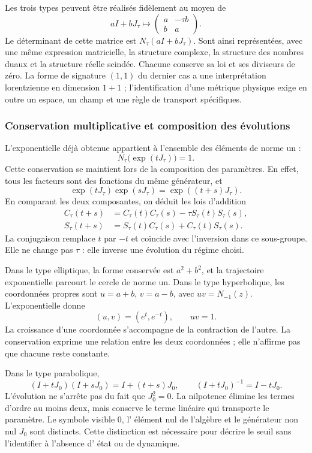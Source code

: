 Les trois types peuvent être réalisés fidèlement au moyen de
\[
 aI+bJ_\tau\longmapsto
 \begin{pmatrix}a&-\tau b\\b&a\end{pmatrix}.
\]
Le déterminant de cette matrice est \(N_\tau(aI+bJ_\tau)\). Sont ainsi
représentées, avec une même expression matricielle, la structure
complexe, la structure des nombres duaux et la structure réelle scindée.
Chacune conserve sa loi et ses diviseurs de zéro. La forme de signature
\((1,1)\) du dernier cas a une interprétation lorentzienne en dimension
\(1+1\) ; l'identification d'une métrique physique exige en outre un espace,
un champ et une règle de transport spécifiques.

\subsubsection{Conservation multiplicative et composition des évolutions}
\label{trit-ampl-evoluciones}

L'exponentielle déjà obtenue appartient à l'ensemble des éléments de norme un :
\[
 N_\tau\bigl(\exp(tJ_\tau)\bigr)=1.
\]
Cette conservation se maintient lors de la composition des paramètres. En effet, tous les
facteurs sont des fonctions du même générateur, et
\[
 \exp(tJ_\tau)\exp(sJ_\tau)=\exp((t+s)J_\tau).
\]
En comparant les deux composantes, on déduit les lois d'addition
\begin{align}
 C_\tau(t+s)&=C_\tau(t)C_\tau(s)-\tau S_\tau(t)S_\tau(s),\\
 S_\tau(t+s)&=S_\tau(t)C_\tau(s)+C_\tau(t)S_\tau(s).
\end{align}
La conjugaison remplace \(t\) par \(-t\) et coïncide avec l'inversion dans
ce sous-groupe. Elle ne change pas \(\tau\) : elle inverse une évolution du régime
choisi.

Dans le type elliptique, la forme conservée est \(a^2+b^2\), et la trajectoire exponentielle parcourt le cercle de norme un. Dans le type hyperbolique, les coordonnées propres sont \(u=a+b\), \(v=a-b\), avec \(uv=N_{-1}(z)\). L'exponentielle donne
\[
 (u,v)=(e^t,e^{-t}),\qquad uv=1.
\]
La croissance d'une coordonnée s'accompagne de la contraction de l'autre.
La conservation exprime une relation entre les deux coordonnées ; elle n'affirme pas que
chacune reste constante.

Dans le type parabolique,
\[
 (I+tJ_0)(I+sJ_0)=I+(t+s)J_0,\qquad
 (I+tJ_0)^{-1}=I-tJ_0.
\]
L'évolution ne s'arrête pas du fait que \(J_0^2=0\). La nilpotence élimine les
termes d'ordre au moins deux, mais conserve le terme linéaire qui
transporte le paramètre. Le symbole visible \(0\), l'
élément nul de l'algèbre et le générateur non nul \(J_0\) sont distincts. Cette distinction
est nécessaire pour décrire le seuil sans l'identifier à l'absence d'
état ou de dynamique.

